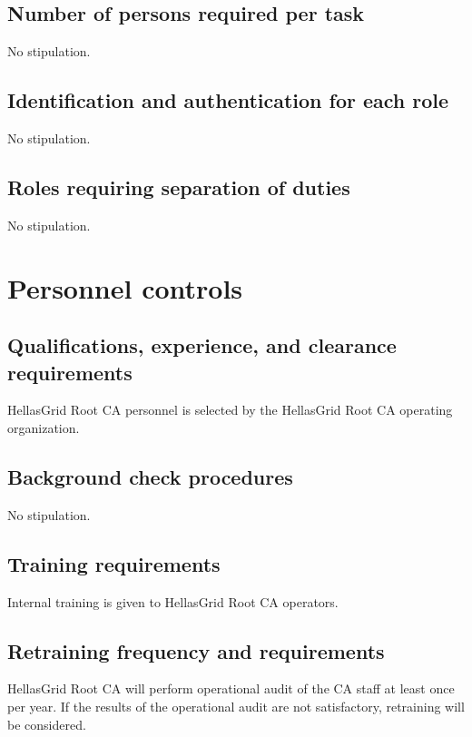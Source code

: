\documentclass[11pt,a4paper,titlepage]{book}
\begin{document}
\subsection{Number of persons required per task}

No stipulation.

\subsection{Identification and authentication for each role}

No stipulation.

\subsection{Roles requiring separation of duties}

No stipulation.

\section{Personnel controls}
\subsection{Qualifications, experience, and clearance requirements}

HellasGrid Root CA personnel is selected by the HellasGrid Root CA operating organization.

\subsection{Background check procedures}

No stipulation.

\subsection{Training requirements}

Internal training is given to HellasGrid Root CA operators.

\subsection{Retraining frequency and requirements}

HellasGrid Root CA will perform operational audit of the CA staff at least once per year. If the results of the operational audit are not satisfactory, retraining will be considered.
\end{document}
